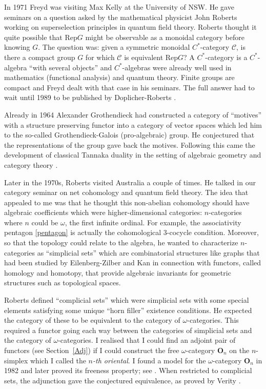 \documentclass[a4paper,12pt]{article}
\theoremstyle{step}
\def\CC{{\mathscr C}}
\begin{document}
 In 1971 Freyd was visiting Max Kelly at the University of NSW. He gave seminars on
 a question asked by the mathematical physicist John Roberts working on superselection principles in quantum field theory. Roberts thought it quite possible that $\mathrm{Rep}G$ might be observable as a monoidal category before knowing $G$. 
 The question was: given a symmetric monoidal $C^*$-category $\CC$, 
 is there a compact group $G$ for which $\CC$ is equivalent $\mathrm{Rep}G$? 
 A $C^*$-category is a $C^*$-algebra ``with several objects'' and $C^*$-algebras 
 were already well used in mathematics (functional analysis) and quantum theory.
Finite groups are compact and Freyd dealt with that case in his seminars. 
The full answer had to wait until 1989 to be published by Doplicher-Roberts \cite{DopRob}.
 
 Already in 1964 Alexander Grothendieck had constructed a category of ``motives''
 with a structure preserving functor into a category of vector spaces which led him
 to the so-called Grothendieck-Galois (pro-algebraic) group. He conjectured that the representations of the group gave back the motives. Following this came the development of classical Tannaka duality \cite{Tan, Che} in the setting of algebraic geometry and category theory \cite{Saa, DelMil}.  
 
 Later in the 1970s, Roberts visited Australia a couple of times. He talked in our category seminar on net cohomology and quantum field theory. The idea that appealed to me was that he thought this non-abelian cohomology should have algebraic coefficients which were higher-dimensional categories: $n$-categories where $n$ could be $\omega$, the first infinite ordinal. 
For example, the associativity pentagon \eqref{pentagon} is actually the cohomological 3-cocycle condition.  
Moreover, so that the topology could relate to the algebra, he wanted to characterize $n$-categories as
 ``simplicial sets'' which are combinatorial structures like graphs that had been studied by
 Eilenberg-Zilber and Kan in connection with functors, called homology and homotopy,
 that provide algebraic invariants for geometric structures such as topological spaces. 
 
 Roberts defined ``complicial sets'' which were simplicial sets with some special elements
 satisfying some unique ``horn filler'' existence conditions. He expected the category of these to be equivalent to the category of $\omega$-categories. This required a functor going each way 
 between the categories of simplicial sets and the category of $\omega$-categories. 
 I realised that I could find an adjoint pair of functors (see Section~\ref{Adj}) if I could construct
 the free $\omega$-category $\mathbf{O}_n$ on the $n$-simplex which I called the {\em $n$-th oriental}. 
 I found a model for the $\omega$-category $\mathbf{O}_n$ in 1982 and later proved its freeness property;
 see \cite{30}. When restricted to complicial sets, the adjunction gave the conjectured equivalence, as proved by Verity \cite{VerO}.              
\end{document}
